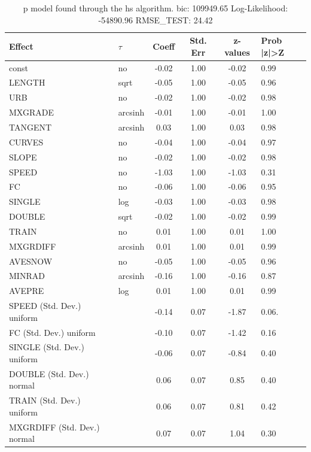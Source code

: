 \begin{table}
	\caption{p model found through the hs algorithm. bic: 109949.65 Log-Likelihood: -54890.96 RMSE_TEST: 24.42}
	\begin{center}
		\begin{tabular}{|l|l|c|c|c|l|}
			\hline
			Effect & $\tau$ & Coeff & Std. Err & z-values & Prob |z|>Z \\
			\hline
			const & no & -0.02 & 1.00 & -0.02 & 0.99 \\
			\hline
			LENGTH & sqrt & -0.05 & 1.00 & -0.05 & 0.96 \\
			\hline
			URB & no & -0.02 & 1.00 & -0.02 & 0.98 \\
			\hline
			MXGRADE & arcsinh & -0.01 & 1.00 & -0.01 & 1.00 \\
			\hline
			TANGENT & arcsinh & 0.03 & 1.00 & 0.03 & 0.98 \\
			\hline
			CURVES & no & -0.04 & 1.00 & -0.04 & 0.97 \\
			\hline
			SLOPE & no & -0.02 & 1.00 & -0.02 & 0.98 \\
			\hline
			SPEED & no & -1.03 & 1.00 & -1.03 & 0.31 \\
			\hline
			FC & no & -0.06 & 1.00 & -0.06 & 0.95 \\
			\hline
			SINGLE & log & -0.03 & 1.00 & -0.03 & 0.98 \\
			\hline
			DOUBLE & sqrt & -0.02 & 1.00 & -0.02 & 0.99 \\
			\hline
			TRAIN & no & 0.01 & 1.00 & 0.01 & 1.00 \\
			\hline
			MXGRDIFF & arcsinh & 0.01 & 1.00 & 0.01 & 0.99 \\
			\hline
			AVESNOW & no & -0.05 & 1.00 & -0.05 & 0.96 \\
			\hline
			MINRAD & arcsinh & -0.16 & 1.00 & -0.16 & 0.87 \\
			\hline
			AVEPRE & log & 0.01 & 1.00 & 0.01 & 0.99 \\
			\hline
			SPEED (Std. Dev.) uniform &  & -0.14 & 0.07 & -1.87 & 0.06. \\
			\hline
			FC (Std. Dev.) uniform &  & -0.10 & 0.07 & -1.42 & 0.16 \\
			\hline
			SINGLE (Std. Dev.) uniform &  & -0.06 & 0.07 & -0.84 & 0.40 \\
			\hline
			DOUBLE (Std. Dev.) normal &  & 0.06 & 0.07 & 0.85 & 0.40 \\
			\hline
			TRAIN (Std. Dev.) uniform &  & 0.06 & 0.07 & 0.81 & 0.42 \\
			\hline
			MXGRDIFF (Std. Dev.) normal &  & 0.07 & 0.07 & 1.04 & 0.30 \\

\end{tabular}
\end{center}
\end{table}
